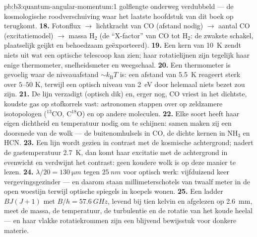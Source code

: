 \begin{solution}{pb:b3:quantum-angular-momentum:1}
golflengte onderweg verdubbeld --- de kosmologische roodverschuiving waar
het laatste hoofdstuk van dit boek op terugkomt.
\textbf{18.} Fotonflux $\to$ lichtkracht van CO (afstand nodig) $\to$
aantal CO (excitatiemodel) $\to$ massa H$_2$ (de ``X-factor'' van CO tot
H$_2$: de zwakste schakel, plaatselijk geijkt en behoedzaam
geëxporteerd).
\textbf{19.} Een kern van \qty{10}{K} zendt niets uit wat een optische
telescoop kan zien; haar rotatielijnen zijn tegelijk haar enige
thermometer, snelheidsmeter en weegschaal.
\textbf{20.} Een thermometer is gevoelig waar de niveauafstand $\sim
k_{\text{B}}T$ is: een afstand van \qty{5.5}{K} reageert sterk over
$5$--$50$ K, terwijl een optisch niveau van \qty{2}{eV} door helemaal
niets bezet zou zijn.
\textbf{21.} De lijn verzadigt (optisch dik) en, erger nog, CO vriest in
het dichtste, koudste gas op stofkorrels vast: astronomen stappen over op
zeldzamere isotopologen ($^{13}$CO, C$^{18}$O) en op andere moleculen.
\textbf{22.} Elke soort heeft haar eigen dichtheid en temperatuur nodig om
te schijnen: samen maken zij een doorsnede van de wolk --- de
buitenomhulsels in CO, de dichte kernen in NH$_3$ en HCN.
\textbf{23.} Een lijn wordt gezien in contrast met de kosmische
achtergrond; nadert de gastemperatuur \qty{2.7}{K}, dan komt haar
excitatie met de achtergrond in evenwicht en verdwijnt het contrast: geen
koudere wolk is op deze manier te lezen.
\textbf{24.} $\lambda/20 = \qty{130}{\micro m}$ tegen $\qty{25}{nm}$ voor
optisch werk: vijfduizend keer vergevingsgezinder --- en daarom staan
millimeterschotels van twaalf meter in de open woestijn terwijl optische
spiegels in koepels wonen.
\textbf{25.} Een ladder $BJ(J+1)$ met $B/h = \qty{57.6}{GHz}$, levend bij
tien kelvin en afgelezen op \qty{2.6}{mm}, meet de massa, de temperatuur,
de turbulentie en de rotatie van het koude heelal --- en haar vlakke
rotatiekrommen zijn een blijvend bewijsstuk voor donkere materie.
\end{solution}
